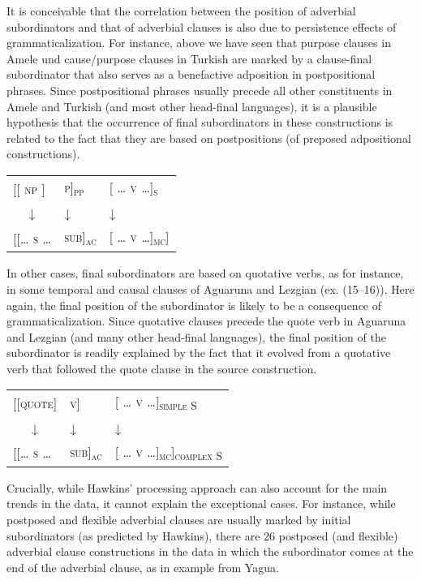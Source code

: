 \documentclass[output=paper]{langsci/langscibook}
\begin{document}
It is conceivable that the correlation between the position of adverbial subordinators and that of adverbial clauses is also due to persistence effects of grammaticalization. For instance, above we have seen that purpose clauses in Amele und cause/purpose clauses in Turkish are marked by a clause-final subordinator that also serves as a benefactive adposition in postpositional phrases. Since postpositional phrases usually precede all other constituents in Amele and Turkish (and most other head-final languages), it is a plausible hypothesis that the occurrence of final subordinators in these constructions is related to the fact that they are based on postpositions (of preposed adpositional constructions). 

\ea\label{ex:diessel:19}
\begin{tabular}[t]{@{}l@{ }ll@{}}
{[[ \textsc{np} ]}  &   {\textsc{p]\textsubscript{pp}}} & {[ \textsc{… v …]\textsubscript{s}}} \\
\multicolumn{1}{c}{↓}  & ↓ & {[ \textsc{… }}↓\\
{[\textsc{[… s …}} & {\textsc{sub]\textsubscript{ac}}} &  {[ \textsc{… v …]\textsubscript{mc}}]}\\
\end{tabular}
\z

In other cases, final subordinators are based on quotative verbs, as for instance, in some temporal and causal clauses of Aguaruna and Lezgian (ex. (15–16)). Here again, the final position of the subordinator is likely to be a consequence of grammaticalization. Since quotative clauses precede the quote verb in Aguaruna and Lezgian (and many other head-final languages), the final position of the subordinator is readily explained by the fact that it evolved from a quotative verb that followed the quote clause in the source construction. 

\ea\label{ex:diessel:20}
\begin{tabular}[t]{@{}l@{ }ll@{}}
{[\textsc{[quote]}} &   {\textsc{v]}}  & {[ \textsc{… v …]\textsubscript{simple S}}}\\
\multicolumn{1}{c}{↓}  & ↓ & {[ \textsc{… }}↓\\
{[[\textsc{… s …}} & {\textsc{sub]\textsubscript{ac}}} &  {[ \textsc{… v …]\textsubscript{mc}]\textsubscript{complex S}}}\\
\end{tabular}
\z

Crucially, while Hawkins’ processing approach can also account for the main trends in the data, it cannot explain the exceptional cases. For instance, while postposed and flexible adverbial clauses are usually marked by initial subordinators (as predicted by Hawkins), there are 26 postposed (and flexible) adverbial clause constructions in the data in which the subordinator comes at the end of the adverbial clause, as in example  from Yagua.
\end{document}
